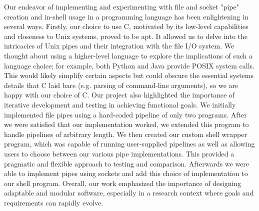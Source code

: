 Our endeavor of implementing and experimenting with file and socket "pipe" creation and in-shell usage in a programming language has been enlightening in several ways. Firstly, our choice to use C, motivated by its low-level capabilities and closeness to Unix systems, proved to be apt. It allowed us to delve into the intricacies of Unix pipes and their integration with the file I/O system. We thought about using a higher-level language to explore the implications of such a language choice; for example, both Python and Java provide POSIX system calls. This would likely simplify certain aspects but could obscure the essential systems details that C laid bare (e.g. parsing of command-line arguments), so we are happy with our choice of C. Our project also highlighted the importance of iterative development and testing in achieving functional goals. We initially implemented file pipes using a hard-coded pipeline of only two programs. After we were satisfied that our implementation worked, we extended this program to handle pipelines of arbitrary length.  We then created our custom shell wrapper program, which was capable of running user-supplied pipelines as well as allowing users to choose between our various pipe implementations. This provided a pragmatic and flexible approach to testing and comparison. Afterwards we were able to implement pipes using sockets and add this choice of implementation to our shell program. Overall, our work emphasized the importance of designing adaptable and modular software, especially in a research context where goals and requirements can rapidly evolve. 




